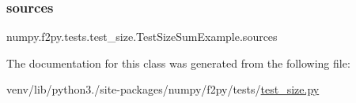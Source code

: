 \subsubsection{\texorpdfstring{sources}{sources}}
{\footnotesize\ttfamily numpy.\+f2py.\+tests.\+test\+\_\+size.\+Test\+Size\+Sum\+Example.\+sources\hspace{0.3cm}{\ttfamily [static]}}



The documentation for this class was generated from the following file\+:\begin{DoxyCompactItemize}
\item 
venv/lib/python3./site-\/packages/numpy/f2py/tests/\hyperlink{test__size_8py}{test\+\_\+size.\+py}\end{DoxyCompactItemize}
